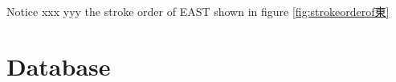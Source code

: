 Notice xxx yyy the stroke order of EAST shown in figure \ref{fig:strokeorderof東}
\section{Database}
\label{sec:hwre:database}






   


